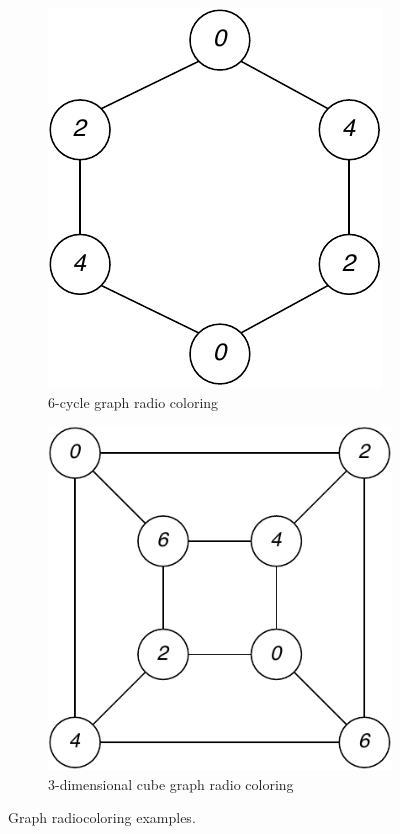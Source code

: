 \documentclass[11pt,a4paper]{article}
\begin{document}
\begin{figure}[t]
   \centering
   \begin{subfigure}{.45\textwidth}
      \centering
      \includegraphics[width=0.522\linewidth]{circle_radiocolor.pdf}
      \caption{6-cycle graph radio coloring}
      \label{fig:circle_radiocolor}
   \end{subfigure}%
   \begin{subfigure}{.45\textwidth}
      \centering
      \includegraphics[width=0.6\linewidth]{cube_radiocolor.pdf}
      \caption{3-dimensional cube graph radio coloring}
      \label{fig:cube_radiocolor}
   \end{subfigure}
   \caption{Graph radiocoloring examples.}
   \label{fig:radiocolor_example}
\end{figure}
\end{document}
